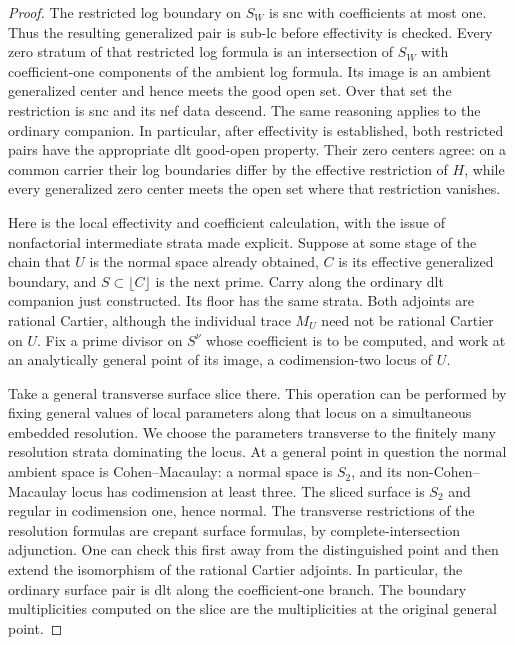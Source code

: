 \begin{proof}
The restricted log boundary on $S_W$ is snc with coefficients at
most one.  Thus the resulting generalized pair is sub-lc before
effectivity is checked.  Every zero stratum of that restricted
log formula is an intersection of $S_W$ with coefficient-one
components of the ambient log formula.  Its image is an ambient
generalized center and hence meets the good open set.  Over that
set the restriction is snc and its nef data descend.  The same
reasoning applies to the ordinary companion.  In particular,
after effectivity is established, both restricted pairs have the
appropriate dlt good-open property.  Their zero centers agree:
on a common carrier their log boundaries differ by the effective
restriction of $H$, while every generalized zero center meets
the open set where that restriction vanishes.

Here is the local effectivity and coefficient calculation, with
the issue of nonfactorial intermediate strata made explicit.
Suppose at some stage of the chain that $U$ is the normal space
already obtained, $C$ is its effective generalized boundary, and
$S\subset\lfloor C\rfloor$ is the next prime.  Carry along the
ordinary dlt companion just constructed.  Its floor has the same
strata.  Both adjoints are rational Cartier, although the
individual trace $M_U$ need not be rational Cartier on $U$.
Fix a prime divisor on $S^\nu$ whose coefficient is to be
computed, and work at an analytically general point of its image,
a codimension-two locus of $U$.

Take a general transverse surface slice there.  This operation
can be performed by fixing general values of local parameters
along that locus on a simultaneous embedded resolution.  We
choose the parameters transverse to the finitely many resolution
strata dominating the locus.  At a general point in question
the normal ambient space is Cohen--Macaulay: a normal space is
$S_2$, and its non-Cohen--Macaulay locus has codimension at least
three.  The sliced surface is $S_2$ and regular in codimension
one, hence normal.  The transverse restrictions of the
resolution formulas are crepant surface formulas, by
complete-intersection adjunction.  One can check this first
away from the distinguished point and then extend the
isomorphism of the rational Cartier adjoints.  In particular,
the ordinary surface pair is dlt along the coefficient-one
branch.  The boundary multiplicities computed on the slice are
the multiplicities at the original general point.


\end{proof}
